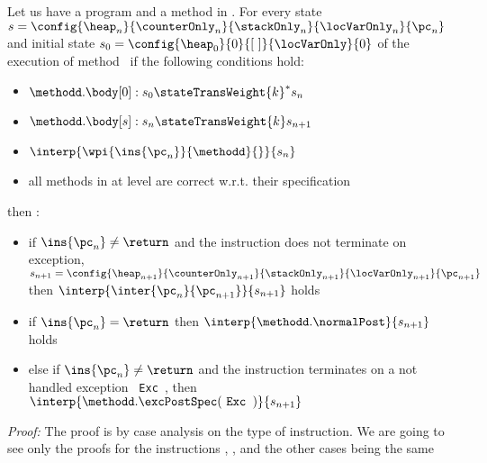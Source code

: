 \begin{lemma} \label{lemma0}
Let us have a program \Program{} and a method \methodd{} in \Program.
For every state $s =\config{\heap_n }{\counterOnly_n }{\stackOnly_n }{\locVarOnly_n }{\pc_n } $ and
initial state $s_{0} =\config{\heap_{0}  }{ 0 }{\lbrack \ \rbrack }{\locVarOnly }{ 0 } $ 
   of the execution of method \methodd \  if the following conditions hold: 
 \begin{itemize}
         \item $ \methodd.\body[0] : s_{0} \stateTransWeight{k}^{*} s_n$
         \item $ \methodd.\body[s] : s_n \stateTransWeight{k} s_{n+1}$
         \item $ \interp{\wpi{\ins{\pc_n}}{\methodd}{}}{s_n} $
	 \item all methods in \Program{} at level  are correct w.r.t. their specification
 \end{itemize}
  
  then : 
 \begin{itemize}
         \item if  $ \ins{\pc_n} \neq \return $ and the instruction does not terminate on exception,
	      $ s_{n+1} = \config{\heap_{n+1} }{\counterOnly_{n+1} }{ \stackOnly_{n+1}}{\locVarOnly_{n+1} }{ \pc_{n+1} }  $
	       then  $ \interp{\inter{\pc_n}{\pc_{n+1}}}{s_{n+1}}  $   holds 
        \item if  $ \ins{\pc_n} = \return $ then  $ \interp{\methodd.\normalPost}{s_{n+1}}  $   holds
	\item else if $ \ins{\pc_n } \neq \return $ and the instruction terminates on a not handled exception \mbox{ \rm\texttt{Exc }}, then
	      $ \interp{\methodd.\excPostSpec( \mbox{ \rm\texttt{Exc }} )}{ s_{n+1} }  $ 
	
  \end{itemize} 
\end{lemma}
\textit{Proof:}
The proof is by case analysis on the type of instruction. %
We are going to see only the proofs for the instructions \return , \load, \new{} and \putfield{} the other cases being the same
